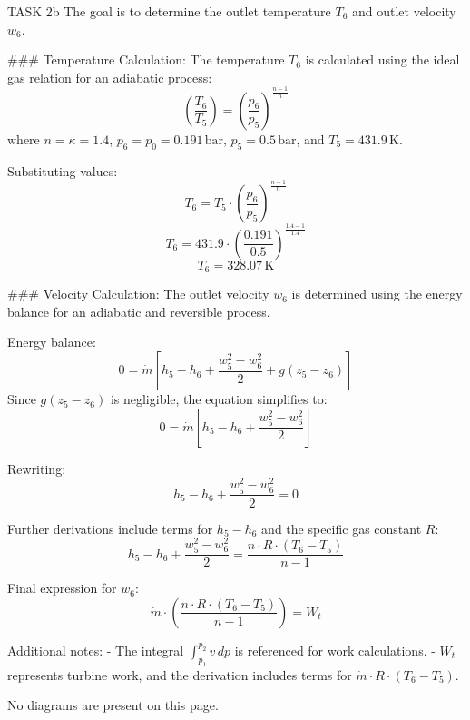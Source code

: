 TASK 2b  
The goal is to determine the outlet temperature \( T_6 \) and outlet velocity \( w_6 \).  

### Temperature Calculation:  
The temperature \( T_6 \) is calculated using the ideal gas relation for an adiabatic process:  
\[
\left( \frac{T_6}{T_5} \right) = \left( \frac{p_6}{p_5} \right)^{\frac{n-1}{n}}
\]  
where \( n = \kappa = 1.4 \), \( p_6 = p_0 = 0.191 \, \text{bar} \), \( p_5 = 0.5 \, \text{bar} \), and \( T_5 = 431.9 \, \text{K} \).  

Substituting values:  
\[
T_6 = T_5 \cdot \left( \frac{p_6}{p_5} \right)^{\frac{n-1}{n}}
\]  
\[
T_6 = 431.9 \cdot \left( \frac{0.191}{0.5} \right)^{\frac{1.4-1}{1.4}}
\]  
\[
T_6 = 328.07 \, \text{K}
\]  

### Velocity Calculation:  
The outlet velocity \( w_6 \) is determined using the energy balance for an adiabatic and reversible process.  

Energy balance:  
\[
0 = \dot{m} \left[ h_5 - h_6 + \frac{w_5^2 - w_6^2}{2} + g(z_5 - z_6) \right]
\]  
Since \( g(z_5 - z_6) \) is negligible, the equation simplifies to:  
\[
0 = \dot{m} \left[ h_5 - h_6 + \frac{w_5^2 - w_6^2}{2} \right]
\]  

Rewriting:  
\[
h_5 - h_6 + \frac{w_5^2 - w_6^2}{2} = 0
\]  

Further derivations include terms for \( h_5 - h_6 \) and the specific gas constant \( R \):  
\[
h_5 - h_6 + \frac{w_5^2 - w_6^2}{2} = \frac{n \cdot R \cdot (T_6 - T_5)}{n-1}
\]  

Final expression for \( w_6 \):  
\[
\dot{m} \cdot \left( \frac{n \cdot R \cdot (T_6 - T_5)}{n-1} \right) = W_t
\]  

Additional notes:  
- The integral \( \int_{p_1}^{p_2} v \, dp \) is referenced for work calculations.  
- \( W_t \) represents turbine work, and the derivation includes terms for \( \dot{m} \cdot R \cdot (T_6 - T_5) \).  

No diagrams are present on this page.